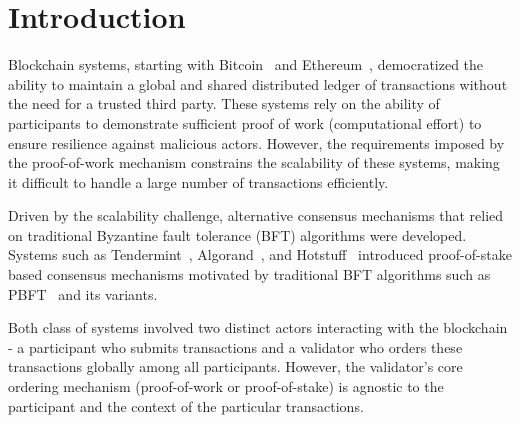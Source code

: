 
\section{Introduction}
\label{sec:contribution}

Blockchain systems, starting with Bitcoin~\cite{Nakamoto09} and Ethereum~\cite{But15}, democratized the ability to maintain a global and shared distributed ledger of transactions without the need for a trusted third party. These systems rely on the ability of participants to demonstrate sufficient proof of work (computational effort) to ensure resilience against malicious actors. However, the requirements imposed by the proof-of-work mechanism constrains the scalability of these systems, making it difficult to handle a large number of transactions efficiently. 

Driven by the scalability challenge, alternative consensus mechanisms that relied on traditional Byzantine fault tolerance (BFT) algorithms were developed. Systems such as Tendermint~\cite{BKM18}, Algorand~\cite{GHMVZ17}, and Hotstuff~\cite{YMRGA19} introduced proof-of-stake based consensus mechanisms motivated by traditional BFT algorithms such as PBFT~\cite{CL99} and its variants. 

Both class of systems involved two distinct actors interacting with the blockchain - a participant who submits transactions and a validator who orders these transactions globally among all participants. However, the validator's core ordering mechanism (proof-of-work or proof-of-stake) is agnostic to the participant and the context of the particular transactions. 

